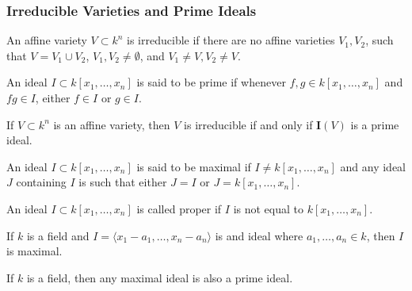             \subsubsection{Irreducible Varieties and Prime Ideals}
                \begin{definition}
                    An affine variety $V\subset k^n$ is irreducible
                    if there are no affine varieties $V_1, V_2$,
                    such that $V = V_1\cup V_2$, $V_1,V_2\ne \emptyset$,
                    and $V_1 \ne V, V_2 \ne V$.
                \end{definition}
                \begin{definition}
                    An ideal $I\subset k[x_1,\hdots ,x_n]$ is
                    said to be prime if whenever
                    $f,g\in k[x_1,\hdots ,x_n]$ and $fg\in I$,
                    either $f\in I$ or $g\in I$.
                \end{definition}
                \begin{theorem}
                    If $V\subset k^n$ is an affine variety,
                    then $V$ is irreducible if and only if
                    $\textbf{I}(V)$ is a prime ideal.
                \end{theorem}
                \begin{definition}
                    An ideal $I\subset k[x_1,\hdots ,x_n]$ is
                    said to be maximal if $I \ne k[x_1,\hdots ,x_n]$
                    and any ideal $J$ containing $I$ is such that
                    either $J=I$ or $J=k[x_1,\hdots ,x_n]$.
                \end{definition}
                \begin{definition}
                    An ideal $I\subset k[x_1,\hdots,x_n]$
                    is called proper if $I$ is not equal to
                    $k[x_1,\hdots ,x_n]$.
                \end{definition}
                \begin{theorem}
                    If $k$ is a field and
                    $I=\langle x_1-a_1,\hdots,x_n-a_n\rangle$
                    is and ideal where $a_1,\hdots, a_n \in k$,
                    then $I$ is maximal.
                \end{theorem}
                \begin{theorem}
                    If $k$ is a field, then any maximal
                    ideal is also a prime ideal.
                \end{theorem}
